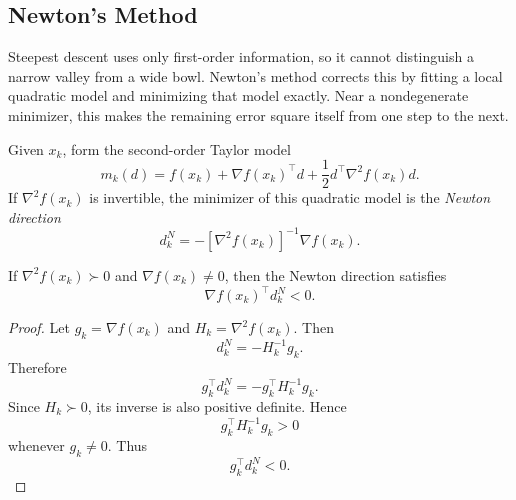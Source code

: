 \subsection{Newton's Method}
\label{sec:l2-newton-s-method}

\begin{intuition}
	Steepest descent uses only first-order information, so it cannot distinguish a narrow valley from a wide bowl. Newton's method corrects this by fitting a local quadratic model and minimizing that model exactly. Near a nondegenerate minimizer, this makes the remaining error square itself from one step to the next.
\end{intuition}

\begin{definition}\label{def:l2-newton-direction}
	Given $x_k$, form the second-order Taylor model
	\[
		m_k(d)=f(x_k)+\nabla f(x_k)^\top d+\frac{1}{2}d^\top \nabla^2 f(x_k)d.
	\]
	If $\nabla^2 f(x_k)$ is invertible, the minimizer of this quadratic model is the \emph{Newton direction}
	\[
		d_k^N = -[\nabla^2 f(x_k)]^{-1}\nabla f(x_k).
	\]
\end{definition}

\begin{proposition}\label{prop:l2-newton-direction-is-a-descent-direction-under-positive-definiteness}
	If $\nabla^2 f(x_k)\succ 0$ and $\nabla f(x_k)\neq 0$, then the Newton direction satisfies
	\[
		\nabla f(x_k)^\top d_k^N < 0.
	\]
\end{proposition}
\begin{proof}
	Let $g_k=\nabla f(x_k)$ and $H_k=\nabla^2 f(x_k)$. Then
	\[
		d_k^N=-H_k^{-1}g_k.
	\]
	Therefore
	\[
		g_k^\top d_k^N = -g_k^\top H_k^{-1}g_k.
	\]
	Since $H_k\succ 0$, its inverse is also positive definite. Hence
	\[
		g_k^\top H_k^{-1}g_k>0
	\]
	whenever $g_k\neq 0$. Thus
	\[
		g_k^\top d_k^N<0.
	\]
\end{proof}

\begin{algorithm}[H]
	\DontPrintSemicolon
	\caption{Damped Newton Method}
\label{alg:l2-damped-newton-method}
\end{algorithm}

